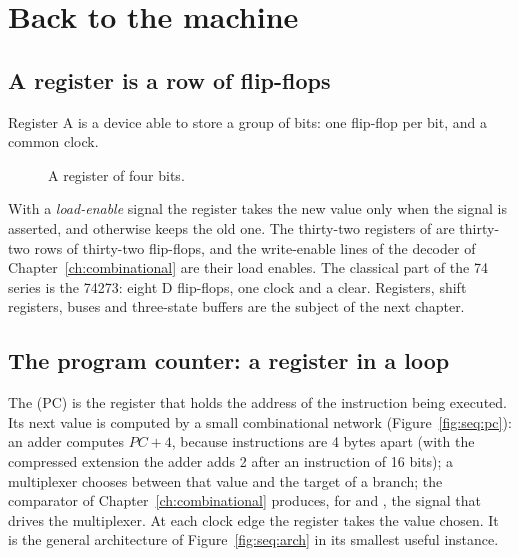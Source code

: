 \section{Back to the machine}

\subsection{A register is a row of flip-flops}

\begin{definition}{Register}
A  is a device able to store a group of bits: one flip-flop per
bit, and a common clock.
\end{definition}

\begin{figure}[htb]
\centering
{}
\caption{A register of four bits.}
\label{fig:seq:reg}
\end{figure}

With a \emph{load-enable} signal the register takes the new value only when
the signal is asserted, and otherwise keeps the old one. The thirty-two
registers of \riscv are thirty-two rows of thirty-two flip-flops, and the
write-enable lines of the decoder of Chapter~\ref{ch:combinational} are their
load enables. The classical part of the 74 series is the 74273: eight D
flip-flops, one clock and a clear. Registers, shift registers, buses and
three-state buffers are the subject of the next chapter.

\subsection{The program counter: a register in a loop}

The  (PC) is the register that holds the address of the
instruction being executed. Its next value is computed by a small
combinational network (Figure~\ref{fig:seq:pc}): an adder computes $PC+4$,
because instructions are 4 bytes apart (with the compressed extension the
adder adds 2 after an instruction of 16 bits); a multiplexer chooses between
that value and the target of a branch; the comparator of
Chapter~\ref{ch:combinational} produces, for  and , the
signal that drives the multiplexer. At each clock edge the register takes the
value chosen. It is the general architecture of Figure~\ref{fig:seq:arch} in
its smallest useful instance.

